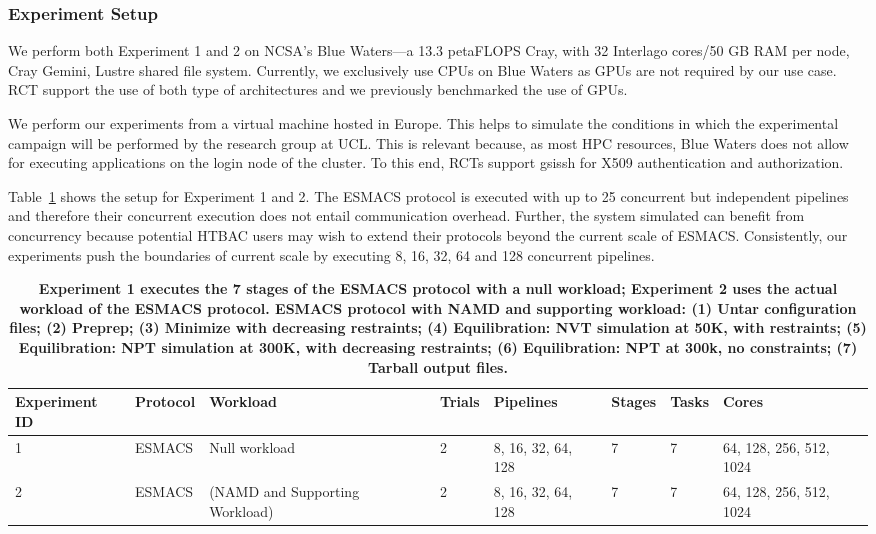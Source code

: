 \subsubsection{Experiment Setup}\label{ssec:exp_setup}

We perform both Experiment 1 and 2 on NCSA's Blue Waters---a 13.3 petaFLOPS
Cray, with 32 Interlago cores/50 GB RAM per node, Cray Gemini, Lustre shared
file system. Currently, we exclusively use CPUs on Blue Waters as GPUs are
not required by our use case. RCT support the use of both type of
architectures and we previously benchmarked the use of GPUs.

We perform our experiments from a virtual machine hosted in Europe. This
helps to simulate the conditions in which the experimental campaign will be
performed by the research group at UCL\@. This is relevant because, as most
HPC resources, Blue Waters does not allow for executing applications on the
login node of the cluster. To this end, RCTs support \textmd{gsissh} for X509
authentication and authorization.

Table~\ref{tab:exp} shows the setup for Experiment 1 and 2. The ESMACS
protocol is executed with up to 25 concurrent but independent pipelines and
therefore their concurrent execution does not entail communication overhead.
Further, the system simulated can benefit from concurrency because potential
HTBAC users may wish to extend their protocols beyond the current scale of
ESMACS\@. Consistently, our experiments push the boundaries of current scale
by executing 8, 16, 32, 64 and 128 concurrent pipelines.

\begin{table}[t]
\centering
\caption{\bf Experiment 1 executes the 7 stages of the ESMACS protocol with
a null workload; Experiment 2 uses the actual workload of the ESMACS
protocol. ESMACS protocol with NAMD and supporting workload: (1) Untar
configuration files; (2) Preprep; (3) Minimize with decreasing restraints;
(4) Equilibration: NVT simulation at 50K, with restraints; (5) Equilibration:
NPT simulation at 300K, with decreasing restraints; (6) Equilibration: NPT at
300k, no constraints; (7) Tarball output files.}\label{tab:exp}
\begin{tabular}{llllllll}
\toprule
\textbf{Experiment ID} & 
\textbf{Protocol}      & 
\textbf{Workload}      & 
\textbf{Trials}        & 
\textbf{Pipelines}     & 
\textbf{Stages}        & 
\textbf{Tasks}         & 
\textbf{Cores} \\ 
\toprule
1 & ESMACS & Null workload & 2 & 8, 16, 32, 64, 128 & 7 & 7 & 64, 128, 256, 512, 1024\\ 
2 & ESMACS & (NAMD and Supporting Workload) & 2 & 8, 16, 32, 64, 128 & 7 & 7 & 64, 128, 256, 512, 1024 \\ 
\bottomrule
\end{tabular}
\end{table}

